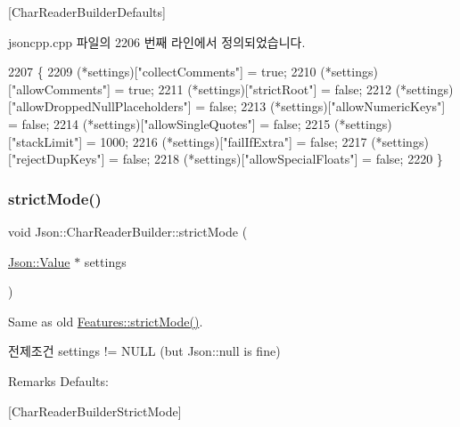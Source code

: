 \mbox{[}Char\+Reader\+Builder\+Defaults\mbox{]} 

jsoncpp.\+cpp 파일의 2206 번째 라인에서 정의되었습니다.


\begin{DoxyCode}
2207 \{
2209   (*settings)[\textcolor{stringliteral}{"collectComments"}] = \textcolor{keyword}{true};
2210   (*settings)[\textcolor{stringliteral}{"allowComments"}] = \textcolor{keyword}{true};
2211   (*settings)[\textcolor{stringliteral}{"strictRoot"}] = \textcolor{keyword}{false};
2212   (*settings)[\textcolor{stringliteral}{"allowDroppedNullPlaceholders"}] = \textcolor{keyword}{false};
2213   (*settings)[\textcolor{stringliteral}{"allowNumericKeys"}] = \textcolor{keyword}{false};
2214   (*settings)[\textcolor{stringliteral}{"allowSingleQuotes"}] = \textcolor{keyword}{false};
2215   (*settings)[\textcolor{stringliteral}{"stackLimit"}] = 1000;
2216   (*settings)[\textcolor{stringliteral}{"failIfExtra"}] = \textcolor{keyword}{false};
2217   (*settings)[\textcolor{stringliteral}{"rejectDupKeys"}] = \textcolor{keyword}{false};
2218   (*settings)[\textcolor{stringliteral}{"allowSpecialFloats"}] = \textcolor{keyword}{false};
2220 \}
\end{DoxyCode}
\mbox{\label{class_json_1_1_char_reader_builder_a9c19e3c5475f9072d527810d4bf56749}} 
\subsubsection{\texorpdfstring{strict\+Mode()}{strictMode()}}
{\footnotesize\ttfamily void Json\+::\+Char\+Reader\+Builder\+::strict\+Mode (\begin{DoxyParamCaption}\item[{\hyperlink{class_json_1_1_value}{Json\+::\+Value} $\ast$}]{settings }\end{DoxyParamCaption})\hspace{0.3cm}{\ttfamily [static]}}

Same as old \hyperlink{class_json_1_1_features_ae23176c14b2e79e81fb61fb1a8ab58ee}{Features\+::strict\+Mode()}. \begin{DoxyPrecond}{전제조건}
\textquotesingle{}settings\textquotesingle{} != N\+U\+LL (but Json\+::null is fine) 
\end{DoxyPrecond}
\begin{DoxyRemark}{Remarks}
Defaults\+: 
\begin{DoxyCodeInclude}
\end{DoxyCodeInclude}

\end{DoxyRemark}
\mbox{[}Char\+Reader\+Builder\+Strict\+Mode\mbox{]}

